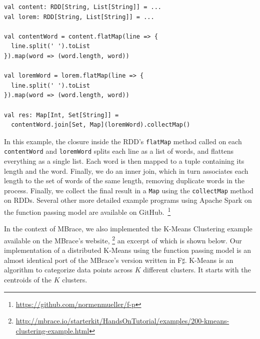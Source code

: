 \documentclass{jfp1}
\begin{document}
\begin{lstlisting}
val content: RDD[String, List[String]] = ...
val lorem: RDD[String, List[String]] = ...

val contentWord = content.flatMap(line => {
  line.split(' ').toList
}).map(word => (word.length, word))

val loremWord = lorem.flatMap(line => {
  line.split(' ').toList
}).map(word => (word.length, word))

val res: Map[Int, Set[String]] =
  contentWord.join[Set, Map](loremWord).collectMap()
\end{lstlisting}

In this example, the closure inside the RDD's \verb|flatMap| method called on
each \verb|contentWord| and \verb|loremWord| splits each line as a list of
words, and flattens everything as a single list. Each word is then mapped to a
tuple containing its length and the word. Finally, we do an inner join, which in
turn associates each length to the set of words of the same length, removing
duplicate words in the process. Finally, we collect the final result in a
\verb|Map| using the \verb|collectMap| method on RDDs. Several other more
detailed example programs using Apache Spark on the function passing model are
available on GitHub.~\footnote{\url{https://github.com/normenmueller/f-p}}

In the context of MBrace, we also implemented the K-Means Clustering example
available on the MBrace's website,
\footnote{\url{http://mbrace.io/starterkit/HandsOnTutorial/examples/200-kmeans-clustering-example.html}}
an excerpt of which is shown below. Our implementation of a distributed K-Means
using the function passing model is an almost identical port of the MBrace’s
version written in F$\sharp$. K-Means is an algorithm to categorize data points across
$K$ different clusters. It starts with the centroids of the $K$ clusters.
\end{document}
